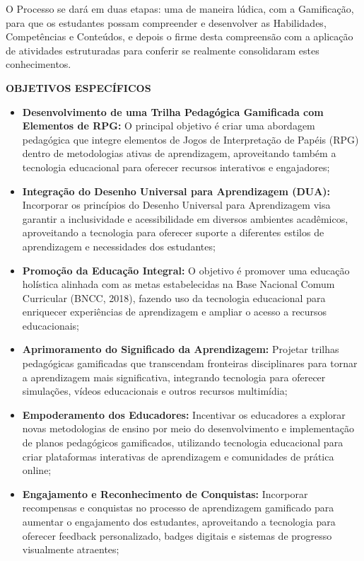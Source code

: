 O Processo se dará em duas etapas: uma de maneira lúdica, com a Gamificação, para que os estudantes possam compreender e desenvolver as Habilidades, Competências e Conteúdos, e depois o firme desta compreensão com a aplicação de atividades estruturadas para conferir se realmente consolidaram estes conhecimentos.

\textbf{OBJETIVOS ESPECÍFICOS}
\\

\begin{itemize}

  \item \textbf{Desenvolvimento de uma Trilha Pedagógica Gamificada com Elementos de RPG:} O principal objetivo é criar uma abordagem pedagógica que integre elementos de Jogos de Interpretação de Papéis (RPG) dentro de metodologias ativas de aprendizagem, aproveitando também a tecnologia educacional para oferecer recursos interativos e engajadores;
\\
  \item \textbf{Integração do Desenho Universal para Aprendizagem (DUA):} Incorporar os princípios do Desenho Universal para Aprendizagem visa garantir a inclusividade e acessibilidade em diversos ambientes acadêmicos, aproveitando a tecnologia para oferecer suporte a diferentes estilos de aprendizagem e necessidades dos estudantes; 
\\
  \item \textbf{Promoção da Educação Integral:} O objetivo é promover uma educação holística alinhada com as metas estabelecidas na Base Nacional Comum Curricular (BNCC, 2018), fazendo uso da tecnologia educacional para enriquecer experiências de aprendizagem e ampliar o acesso a recursos educacionais;
\\
  \item \textbf{Aprimoramento do Significado da Aprendizagem:} Projetar trilhas pedagógicas gamificadas que transcendam fronteiras disciplinares para tornar a aprendizagem mais significativa, integrando tecnologia para oferecer simulações, vídeos educacionais e outros recursos multimídia;
\\
  \item \textbf{Empoderamento dos Educadores:} Incentivar os educadores a explorar novas metodologias de ensino por meio do desenvolvimento e implementação de planos pedagógicos gamificados, utilizando tecnologia educacional para criar plataformas interativas de aprendizagem e comunidades de prática online;  
\\
  \item \textbf{Engajamento e Reconhecimento de Conquistas:} Incorporar recompensas e conquistas no processo de aprendizagem gamificado para aumentar o engajamento dos estudantes, aproveitando a tecnologia para oferecer feedback personalizado, badges digitais e sistemas de progresso visualmente atraentes;

\end{itemize}
